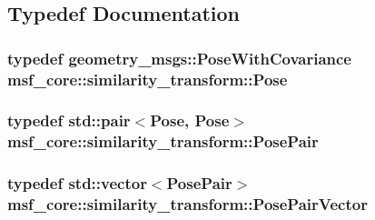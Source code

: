 \subsection{Typedef Documentation}
\hypertarget{namespacemsf__core_1_1similarity__transform_a7ecde3e7b02bda457b404fc49b03179f}{
\subsubsection[{Pose}]{\setlength{\rightskip}{0pt plus 5cm}typedef geometry\-\_\-msgs\-::\-Pose\-With\-Covariance {\bf msf\-\_\-core\-::similarity\-\_\-transform\-::\-Pose}}}\label{namespacemsf__core_1_1similarity__transform_a7ecde3e7b02bda457b404fc49b03179f}
\hypertarget{namespacemsf__core_1_1similarity__transform_aaf333aba3d1f81a96f7294f05f311590}{
\subsubsection[{Pose\-Pair}]{\setlength{\rightskip}{0pt plus 5cm}typedef std\-::pair$<${\bf Pose}, {\bf Pose}$>$ {\bf msf\-\_\-core\-::similarity\-\_\-transform\-::\-Pose\-Pair}}}\label{namespacemsf__core_1_1similarity__transform_aaf333aba3d1f81a96f7294f05f311590}
\hypertarget{namespacemsf__core_1_1similarity__transform_aa03b1c4b07f85bede2f9cad021e3df7a}{
\subsubsection[{Pose\-Pair\-Vector}]{\setlength{\rightskip}{0pt plus 5cm}typedef std\-::vector$<${\bf Pose\-Pair}$>$ {\bf msf\-\_\-core\-::similarity\-\_\-transform\-::\-Pose\-Pair\-Vector}}}\label{namespacemsf__core_1_1similarity__transform_aa03b1c4b07f85bede2f9cad021e3df7a}
